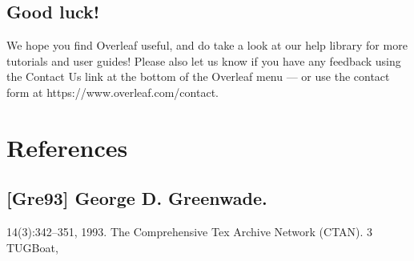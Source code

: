 \documentclass{article}
\begin{document}
\subsection{Good luck!}
 We hope you find Overleaf useful, and do take a look at our help library for more tutorials and user
 guides! Please also let us know if you have any feedback using the Contact Us link at the bottom of
 the Overleaf menu — or use the contact form at https://www.overleaf.com/contact.
 \section{References}
 \subsection{[Gre93] George D. Greenwade.}
 	14(3):342–351, 1993.
 	The Comprehensive Tex Archive Network (CTAN).
 	3
 	TUGBoat,
 
\end{document}
